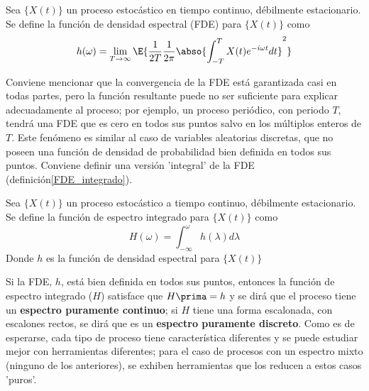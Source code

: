 \begin{defn}
Sea $\{X(t)\}$ un proceso estoc\'astico en tiempo continuo, d\'ebilmente estacionario. Se define la 
funci\'on de densidad espectral (FDE) para $\{X(t)\}$ como
\begin{equation*}
h(\omega) = \lim_{T\rightarrow \infty} \E{ \frac{1}{2T} \frac{1}{2 \pi}
\abso{ \int_{-T}^{T} X(t) e^{-i \omega t} dt}^{2} }
\end{equation*}
\label{FDE}
\end{defn}

Conviene mencionar que la convergencia de la FDE est\'a garantizada casi en todas partes, pero la
funci\'on resultante puede no ser suficiente para explicar adecuadamente al proceso; por ejemplo, 
un proceso peri\'odico, con periodo $T$, tendr\'a una FDE que es cero en todos sus puntos salvo en 
los m\'ultiplos enteros de $T$.
Este fen\'omeno es similar al caso de variables aleatorias discretas, que no poseen una funci\'on 
de densidad de probabilidad bien definida en todos sus puntos.
Conviene definir una versi\'on 'integral' de la FDE (definici\'on\ref{FDE_integrado}).

\begin{defn}
Sea $\{X(t)\}$ un proceso estoc\'astico a tiempo continuo, d\'ebilmente estacionario. Se define la 
funci\'on de espectro integrado para $\{X(t)\}$ como
\begin{equation*}
H(\omega) = \int_{-\infty}^{\omega} h(\lambda) d\lambda
\end{equation*}
Donde $h$ es la funci\'on de densidad espectral para $\{X(t)\}$
\label{FDE_integrado}
\end{defn}

Si la FDE, $h$, est\'a bien definida en todos sus puntos, entonces la funci\'on de espectro 
integrado ($H$) satisface que $H\prima= h$ y se dir\'a que el proceso tiene un \textbf{espectro 
puramente continuo}; si $H$ tiene una forma escalonada, con escalones rectos, se dir\'a que es un 
\textbf{espectro puramente discreto}.
Como es de esperarse, cada tipo de proceso tiene caracter\'istica diferentes y se puede estudiar 
mejor con herramientas diferentes; para el caso de procesos con un espectro mixto (ninguno de los 
anteriores), se exhiben herramientas que los reducen a estos casos 'puros'.

